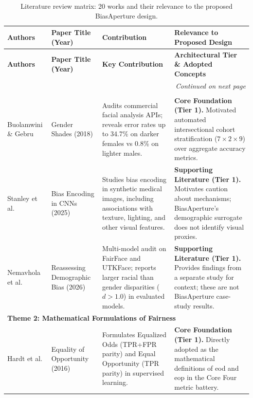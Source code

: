 \begin{center}
\setlength{\tabcolsep}{3pt}
\begin{longtable}{|p{2.2cm}|p{2.6cm}|p{4.4cm}|p{4.4cm}|}
\caption{Literature review matrix: 20 works and their relevance to the proposed BiasAperture design.}
\label{tab:litreview} \\
\hline
\textbf{Authors} & \textbf{Paper Title (Year)} & \textbf{Contribution} & \textbf{Relevance to Proposed Design} \\
\hline
\endfirsthead

\hline
\textbf{Authors} & \textbf{Paper Title (Year)} & \textbf{Key Contribution} & \textbf{Architectural Tier \& Adopted Concepts} \\
\hline
\endhead

\hline \multicolumn{4}{r}{\textit{Continued on next page}} \\
\endfoot

\hline
\endlastfoot

\multicolumn{4}{|l|}{\textbf{Theme 1: Empirical Foundations of Intersectional Bias}} \\
\hline
Buolamwini \& Gebru \cite{buolamwini2018gendershades} &
Gender Shades (2018) &
Audits commercial facial analysis APIs; reveals error rates up to 34.7\% on darker females vs 0.8\% on lighter males. &
\textbf{Core Foundation (Tier 1).} Motivated automated intersectional cohort stratification ($7 \times 2 \times 9$) over aggregate accuracy metrics. \\
\hline

Stanley et al. \cite{stanley2025bias} &
Bias Encoding in CNNs (2025) &
Studies bias encoding in synthetic medical images, including associations with texture, lighting, and other visual features. &
\textbf{Supporting Literature (Tier 1).} Motivates caution about mechanisms; BiasAperture's demographic surrogate does not identify visual proxies. \\
\hline

Nemavhola et al. \cite{nemavhola2026reassessing} &
Reassessing Demographic Bias (2026) &
Multi-model audit on FairFace and UTKFace; reports larger racial than gender disparities ($d > 1.0$) in evaluated models. &
\textbf{Supporting Literature (Tier 1).} Provides findings from a separate study for context; these are not BiasAperture case-study results. \\
\hline

\multicolumn{4}{|l|}{\textbf{Theme 2: Mathematical Formulations of Fairness}} \\
\hline
Hardt et al. \cite{hardt2016equality} &
Equality of Opportunity (2016) &
Formulates Equalized Odds (TPR+FPR parity) and Equal Opportunity (TPR parity) in supervised learning. &
\textbf{Core Foundation (Tier 1).} Directly adopted as the mathematical definitions of \gls{eod} and \gls{eop} in the Core Four metric battery. \\
\hline


\end{longtable}
\end{center}
